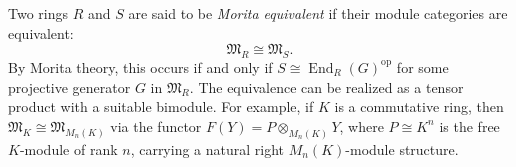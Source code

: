Two rings $R$ and $S$ are said to be {\it Morita equivalent} if their module categories are equivalent:
\[
\mathfrak{M}_R \cong \mathfrak{M}_S.
\]
By Morita theory, this occurs if and only if $S \cong \operatorname{End}_R(G)^{\mathrm{op}}$ for some projective generator $G$ in $\mathfrak{M}_R$. The equivalence can be realized as a tensor product with a suitable bimodule. For example, if $K$ is a commutative ring, then $\mathfrak{M}_K \cong \mathfrak{M}_{M_n(K)}$ via the functor $F(Y) = P \otimes_{M_n(K)} Y$, where $P \cong K^n$ is the free $K$-module of rank $n$, carrying a natural right $M_n(K)$-module structure.
